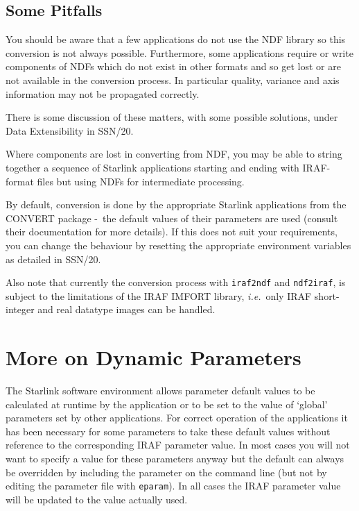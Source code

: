 \documentclass[twoside,11pt]{article}
\newcommand{\xref}[3]{#1}
\newcommand{\xlabel}[1]{}
\newcommand{\dash}{--}
\renewcommand{\dash}{-}
\begin{document}
\subsection{\xlabel{some_pitfalls}Some Pitfalls}
You should be aware that a few applications do not use the NDF library so 
this conversion is not always possible. 
Furthermore, some applications require or write components of NDFs which do 
not exist in other formats and so get lost or are not available in the 
conversion process. 
In particular quality, variance and axis information may not be propagated
correctly.

There is some discussion of these matters, with some possible solutions, under
\xref{Data Extensibility}{ssn20}{general_principles_of_extensibility}
in SSN/20.

Where components are lost in converting from NDF, you may be able
to string together a sequence of Starlink applications starting and 
ending with IRAF-format files but using NDFs for intermediate processing.

By default, conversion is done by the appropriate Starlink applications from 
the
\xref{CONVERT}{sun55}{}
package \dash\ the default values of their 
parameters are used (consult their documentation for more details). 
If this does not suit your requirements, you can change the behaviour by 
resetting the appropriate environment variables as detailed in
\xref{SSN/20}{ssn20}{}.

Also note that currently the conversion process with
\xref{\texttt{iraf2ndf}}{sun55}{IRAF2NDF}
and
\xref{\texttt{ndf2iraf}}{sun55}{NDF2IRAF},
is subject to the limitations of the IRAF IMFORT library, \textit{i.e.}\ only 
IRAF short-integer and real datatype images can be handled.

\section{\xlabel{more_on_dynamic_parameters}\label{more_on_dynamic_parameters}More on Dynamic Parameters}
The Starlink software environment allows parameter default values to be
calculated at runtime by the application or to be set to the value of
`global' parameters set by other applications. 
For correct operation of the applications
it has been necessary for some parameters to take these default values without
reference to the corresponding IRAF parameter value. 
In most cases you will not want to specify a value for these parameters
anyway but the default can always be overridden by including the parameter on 
the command line (but not by editing the parameter file with \texttt{eparam}). 
In all cases the IRAF parameter value will be updated to the value actually
used. 
\end{document}
